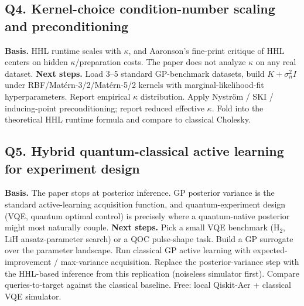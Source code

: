 \subsection*{Q4. Kernel-choice condition-number scaling and preconditioning}
\textbf{Basis.} HHL runtime scales with $\kappa$, and Aaronson's
fine-print critique of HHL centers on hidden $\kappa$/preparation
costs. The paper does not analyze $\kappa$ on any real dataset.
\textbf{Next steps.} Load 3--5 standard GP-benchmark datasets, build
$K + \sigma_n^2 I$ under RBF/Mat\'ern-3/2/Mat\'ern-5/2 kernels with
marginal-likelihood-fit hyperparameters. Report empirical $\kappa$
distribution. Apply Nystr\"om / SKI / inducing-point preconditioning;
report reduced effective $\kappa$. Fold into the theoretical HHL
runtime formula and compare to classical Cholesky.

\subsection*{Q5. Hybrid quantum-classical active learning for experiment design}
\textbf{Basis.} The paper stops at posterior inference. GP posterior
variance is the standard active-learning acquisition function, and
quantum-experiment design (VQE, quantum optimal control) is precisely
where a quantum-native posterior might most naturally couple.
\textbf{Next steps.} Pick a small VQE benchmark (H$_2$, LiH
ansatz-parameter search) or a QOC pulse-shape task. Build a GP
surrogate over the parameter landscape. Run classical GP active
learning with expected-improvement / max-variance acquisition. Replace
the posterior-variance step with the HHL-based inference from this
replication (noiseless simulator first). Compare queries-to-target
against the classical baseline. Free: local Qiskit-Aer + classical
VQE simulator.
